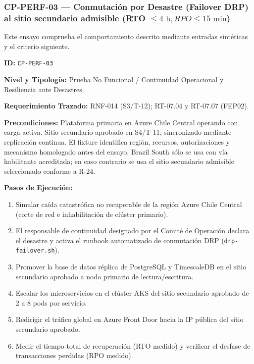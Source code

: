 \subsubsection*{CP-PERF-03 — Conmutación por Desastre (Failover DRP) al sitio secundario admisible (RTO $\le 4\text{ h}, RPO \le 15\text{ min}$)}\label{sec:9-cp-perf-03}
Este ensayo comprueba el comportamiento descrito mediante entradas sintéticas y el criterio siguiente.

\par\noindent \textbf{ID:} \texttt{CP-\allowbreak{}PERF-\allowbreak{}03}\par
\par\noindent \textbf{Nivel y Tipología:} Prueba No Funcional / Continuidad Operacional y Resiliencia ante Desastres.\par
\par\noindent \textbf{Requerimiento Trazado:} RNF-014 (S3/T-12); RT-07.04 y RT-07.07 (FEP02).\par
\par\noindent \textbf{Precondiciones:} Plataforma primaria en Azure Chile Central operando con carga activa. Sitio secundario aprobado en S4/T-11, sincronizado mediante replicación continua. El fixture identifica región, recursos, autorizaciones y mecanismo homologado antes del ensayo. Brazil South sólo se usa con vía habilitante acreditada; en caso contrario se usa el sitio secundario admisible seleccionado conforme a R-24.\par
\par\noindent \textbf{Pasos de Ejecución:}\par
\begin{enumerate}
\item Simular caída catastrófica no recuperable de la región Azure Chile Central (corte de red e inhabilitación de clúster primario).
\item El responsable de continuidad designado por el Comité de Operación declara el desastre y activa el runbook automatizado de conmutación DRP (\texttt{drp-\allowbreak{}failover.sh}).
\item Promover la base de datos réplica de PostgreSQL y TimescaleDB en el sitio secundario aprobado a nodo primario de lectura/escritura.
\item Escalar los microservicios en el clúster AKS del sitio secundario aprobado de 2 a 8 pods por servicio.
\item Redirigir el tráfico global en Azure Front Door hacia la IP pública del sitio secundario aprobado.
\item Medir el tiempo total de recuperación (RTO medido) y verificar el desfase de transacciones perdidas (RPO medido).
\end{enumerate}

